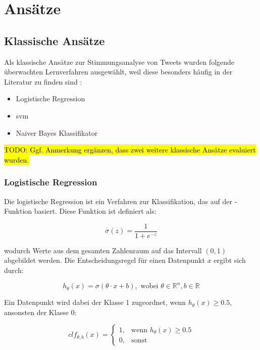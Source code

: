 \documentclass[researchlab,group,]{AIGpaper}
\newcommand{\redhl}{\sethlcolor{red}\hl}
\begin{document}
\section{Ansätze}

\subsection{Klassische Ansätze}

Als klassische Ansätze zur Stimmungsanalyse von Tweets wurden folgende überwachten Lernverfahren ausgewählt, weil diese besonders häufig in der Literatur zu finden sind \cite{wankhade2022survey, medhat2014sentiment, zimbra2018state}:

\begin{itemize}
    \item Logistische Regression
    \item \gls{svm}
    \item Naiver Bayes Klassifikator
\end{itemize}

\redhl{TODO: Ggf. Anmerkung ergänzen, dass zwei weitere klassische Ansätze evaluiert wurden.}

\subsubsection{Logistische Regression}

Die logistische Regression ist ein Verfahren zur Klassifikation, das auf der \Sigmoid-Funktion basiert. Diese Funktion ist definiert als:

\begin{equation*}
    \sigma(z) = \frac{1}{1 + e^{-z}}
\end{equation*}

wodurch Werte aus dem gesamten Zahlenraum auf das Intervall $(0,1)$ abgebildet werden. Die Entscheidungsregel für einen Datenpunkt $x$ ergibt sich durch:

\begin{equation*}
    h_{\theta}(x) = \sigma(\theta \cdot x + b), \text{ wobei } \theta \in \mathbb{R}^{n}, b \in \mathbb{R}
\end{equation*}

Ein Datenpunkt wird dabei der Klasse 1 zugeordnet, wenn $h_{\theta}(x) \geq 0.5$, ansonsten der Klasse 0:

\begin{equation*}
    clf_{\theta, b}(x) =
    \begin{cases}
        1, & \text{wenn } h_{\theta}(x) \geq 0.5 \\
        0, & \text{sonst}
    \end{cases}
\end{equation*}
\end{document}
